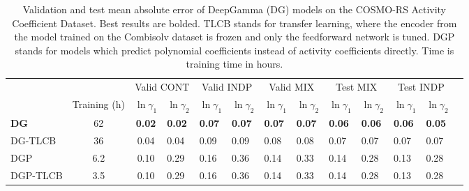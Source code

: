 \begin{table}[t]
\centering
\caption{Validation and test mean absolute error of DeepGamma (DG) models on the COSMO-RS Activity  Coefficient Dataset. Best results are bolded. TLCB stands for transfer learning, where the encoder from the model trained on the Combisolv dataset is frozen and only the feedforward network is tuned. DGP stands for models which predict polynomial coefficients instead of activity coefficients directly. Time is training time in hours.}
\label{cosmo_rs_results}
\begin{tabular}{lccllllllllll}
& & \multicolumn{2}{c}{Valid CONT} &  \multicolumn{2}{c}{Valid  INDP}  &  \multicolumn{2}{c}{Valid MIX}  &\multicolumn{2}{c}{Test MIX} &  \multicolumn{2}{c}{Test  INDP} \\
& Training (h) & $\ln\gamma_1$ & $\ln\gamma_2$ & $\ln\gamma_1$ & $\ln\gamma_2$ & $\ln\gamma_1$ & $\ln\gamma_2$ & $\ln\gamma_1$ & $\ln\gamma_2$ & $\ln\gamma_1$ & $\ln\gamma_2$ \\
\hline 
\textbf{DG}  &     62           & \textbf{0.02 }                               & \textbf{0.02  }                              & \textbf{0.07}                                & \textbf{0.07}                                & \textbf{0.07 }                               & \textbf{0.07  }                              &\textbf{ 0.06  }                              & \textbf{0.06  }                              & \textbf{0.06   }                             & \textbf{0.05 }                               \\
DG-TLCB &  36    & 0.04                                & 0.04                                & 0.09                                & 0.09                                & 0.08                                & 0.08                                & 0.07                                & 0.07                                & 0.07                                & 0.07                                \\
DGP &    6.2      & 0.10                                & 0.29                                & 0.16                                & 0.36                                & 0.14                                & 0.33                                & 0.14                                & 0.28                                & 0.13                                & 0.28                                \\
DGP-TLCB & 3.5 & 0.10                                & 0.29                                & 0.16                                & 0.36                                & 0.14                                & 0.33                                & 0.14                                & 0.28                                & 0.13                                & 0.28                               
\end{tabular}
\end{table}

